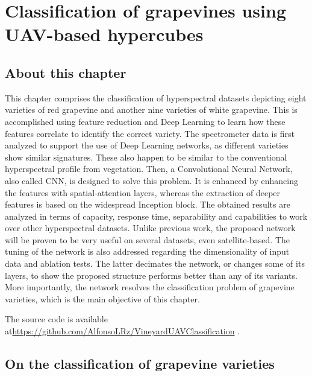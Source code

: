 \setchapterpreamble[u]{\margintoc}
\chapter{Classification of grapevines using UAV-based hypercubes}
\label{sec:vineyard_classification}

\section*{About this chapter}

This chapter comprises the classification of hyperspectral datasets depicting eight varieties of red grapevine and another nine varieties of white grapevine. This is accomplished using feature reduction and Deep Learning to learn how these features correlate to identify the correct variety. The spectrometer data is first analyzed to support the use of Deep Learning networks, as different varieties show similar signatures. These also happen to be similar to the conventional hyperspectral profile from vegetation. Then, a Convolutional Neural Network, also called CNN, is designed to solve this problem. It is enhanced by enhancing the features with spatial-attention layers, whereas the extraction of deeper features is based on the widespread Inception block. The obtained results are analyzed in terms of capacity, response time, separability and capabilities to work over other hyperspectral datasets. Unlike previous work, the proposed network will be proven to be very useful on several datasets, even satellite-based. The tuning of the network is also addressed regarding the dimensionality of input data and ablation tests. The latter decimates the network, or changes some of its layers, to show the proposed structure performs better than any of its variants. More importantly, the network resolves the classification problem of grapevine varieties, which is the main objective of this chapter.

The source code is available at\newline \footnotesize\url{https://github.com/AlfonsoLRz/VineyardUAVClassification} \normalsize.

\section{On the classification of grapevine varieties}

